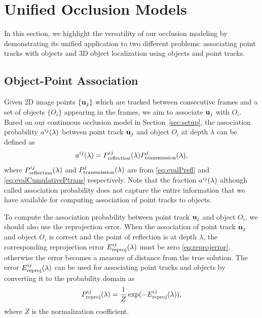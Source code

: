 \section{Unified Occlusion Models}
\label{sec:unified}

In this section, we highlight the versatility of our occlusion modeling by demonstrating its unified application to two different problems: associating point tracks with objects and 3D object localization using objects and point tracks.

\subsection{Object-Point Association}
\label{sec:association}


Given 2D image points $\{\mathbf{u}_j\}$ which are tracked between consecutive frames and a set of objects $\{O_i\}$ appearing in the frames, we aim to associate $\mathbf{u}_j$ with $O_i$. Based on our continuous occlusion model in Section~\ref{sec:setup}, the association probability $a^{ij}(\lambda)$ between point track $\mathbf{u}_j$ and object $O_i$ at depth $\lambda$ can be defined as
\begin{align}
a^{ij}(\lambda) = P^{ij}_{\text{reflection}}(\lambda)P^{j}_{\text{transmission}}(\lambda),
\label{eq:defineassocP}
\end{align}
where $P^{ij}_{\text{reflection}}(\lambda)$ and $P^{j}_{\text{transmission}}(\lambda)$ are from \eqref{eq:evalPrefl} and \eqref{eq:evalCumulativePtrans} respectively. Note that the fraction $a^{ij}(\lambda)$ although called association probability does not capture the entire information that we have available for computing association of point tracks to objects. 

To compute the association probability between point track $\mathbf{u}_j$ and object $O_i$, we should also use the reprojection error. When the association of point track $\mathbf{u}_j$ and object $O_i$ is correct and the point of reflection is at depth $\lambda$, the corresponding reprojection error $E^{ij}_{\text{reproj}}(\lambda)$ must be zero \eqref{eq:reprojerror}, otherwise the error becomes a measure of distance from the true solution. The error $E^{ij}_{\text{reproj}}(\lambda)$ can be used for associating point tracks and objects by converting it to the probability domain as
\begin{align}
  P^{ij}_{\text{reproj}}(\lambda) = \frac{1}{Z}\exp(-E^{ij}_{\text{reproj}}(\lambda)),
\label{eq:Passocbyreproj}
\end{align}
where $Z$ is the normalization coefficient.

